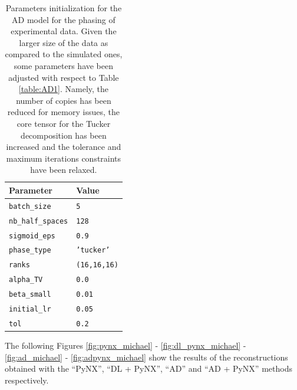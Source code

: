 \begin{table}[H] 

  \centering
  {%
    \begin{tabular}{|l|l|}
      \hline
      \textbf{Parameter} & \textbf{Value} \\
      \hline 
      \texttt{batch\_size}                      & \texttt{5} \\
      \texttt{nb\_half\_spaces}                 & \texttt{128} \\
      \texttt{sigmoid\_eps}                     & \texttt{0.9} \\
      \texttt{phase\_type}                      & \texttt{'tucker'} \\
      \texttt{ranks}                            & \texttt{(16,16,16)} \\
      \texttt{alpha\_TV}                        & \texttt{0.0} \\
      \texttt{beta\_small}                      & \texttt{0.01} \\
      \texttt{initial\_lr}                      & \texttt{0.05} \\
      \texttt{tol}                              & \texttt{0.2} \\

      \hline
    \end{tabular}%
  } 
  \caption{Parameters initialization for the AD model for the phasing of experimental data. Given the larger size of the 
  data as compared to the simulated ones, some parameters have been adjusted with respect to 
  Table \ref{table:AD1}. Namely, the number of copies has been reduced for memory issues, the core tensor for the 
  Tucker decomposition has been increased and the tolerance and maximum iterations constraints have been relaxed. }
  \label{table:AD}
\end{table}


The following Figures \ref{fig:pynx_michael} - \ref{fig:dl_pynx_michael} - \ref{fig:ad_michael} - \ref{fig:adpynx_michael} show the results 
of the reconstructions obtained with the ``PyNX'', ``DL + PyNX'', ``AD'' and ``AD + PyNX'' methods respectively. 


